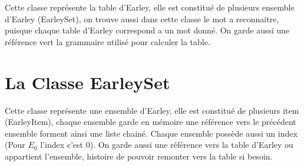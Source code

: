 \documentclass[10pt]{report}
\begin{document}
Cette classe représente la table d'Earley, elle est constitué de plusieurs ensemble d'Earley (EarleySet), on trouve aussi dans cette classe le mot a reconnaitre, puisque chaque table d'Earley correspond a un mot donné. On garde aussi une référence vert la grammaire utilisé pour calculer la table.

\section{La Classe EarleySet}

Cette classe représente une ensemble d'Earley, elle est constitué de plusieurs item (EarleyItem), chaque ensemble garde en mémoire une référence vers le précédent ensemble forment ainsi une liste chainé. Chaque ensemble possède aussi un index (Pour $E_0$ l'index c'est $0$). On garde aussi une référence vers la table d'Earley ou appartient l'ensemble, histoire de pouvoir remonter vers la table si besoin.
\end{document}
